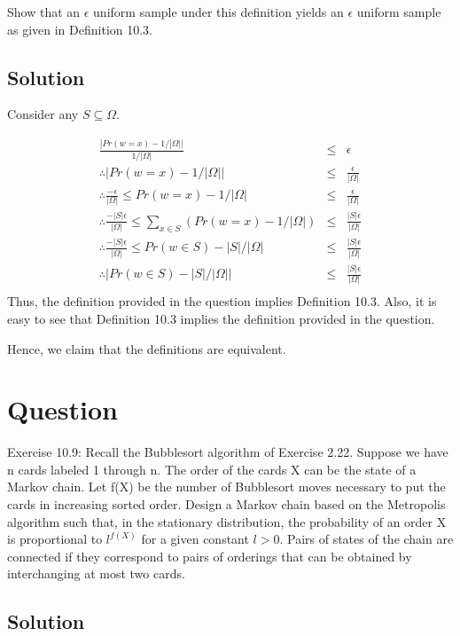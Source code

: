 \documentclass[10pt]{amsart}
\theoremstyle{remark}
\begin{document}
Show that an $\epsilon $ uniform sample under this definition yields an $\epsilon$ uniform sample as given in Definition 10.3.

\subsection{Solution}

Consider any $S \subseteq \Omega$.

\begin{eqnarray*}
\frac{|Pr(w=x)-1/|\Omega||}{1/|\Omega|} &\leq& \epsilon \\
\therefore |Pr(w=x)-1/|\Omega|| &\leq& \frac{\epsilon }{|\Omega|}\\
\therefore \frac{-\epsilon }{|\Omega|} \leq Pr(w=x)-1/|\Omega| &\leq& \frac{\epsilon }{|\Omega|}\\
\therefore \frac{-|S|\epsilon }{|\Omega|} \leq \sum_{x \in S} (Pr(w=x)-1/|\Omega|) &\leq& \frac{|S|\epsilon }{|\Omega|}\\
\therefore \frac{-|S|\epsilon }{|\Omega|} \leq Pr(w\in S)-|S|/|\Omega| &\leq& \frac{|S|\epsilon }{|\Omega|}\\
\therefore |Pr(w\in S)-|S|/|\Omega|| &\leq& \frac{|S|\epsilon }{|\Omega|}\\
\end{eqnarray*}
Thus, the definition provided in the question implies Definition 10.3. Also, it is easy to see that Definition 10.3 implies the definition provided in the question.

Hence, we claim that the definitions are equivalent.

\section{Question}
Exercise 10.9: Recall the Bubblesort algorithm of Exercise 2.22. Suppose we have n cards labeled 1 through n. The order of the cards X can be the state of a Markov chain. Let f(X) be the number of Bubblesort moves necessary to put the cards in increasing sorted order. Design a Markov chain based on the Metropolis algorithm such that, in the stationary distribution, the probability of an order X is proportional to $l^{f(X)}$ for a given constant $l>0$. Pairs of states of the chain are connected if they correspond to pairs of orderings that can be obtained by interchanging at most two cards.

\subsection{Solution}
\end{document}
